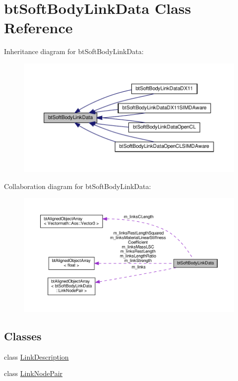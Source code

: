 \hypertarget{classbtSoftBodyLinkData}{}\section{bt\+Soft\+Body\+Link\+Data Class Reference}
\label{classbtSoftBodyLinkData}


Inheritance diagram for bt\+Soft\+Body\+Link\+Data\+:
\nopagebreak
\begin{figure}[H]
\begin{center}
\leavevmode
\includegraphics[width=350pt]{classbtSoftBodyLinkData__inherit__graph}
\end{center}
\end{figure}


Collaboration diagram for bt\+Soft\+Body\+Link\+Data\+:
\nopagebreak
\begin{figure}[H]
\begin{center}
\leavevmode
\includegraphics[width=350pt]{classbtSoftBodyLinkData__coll__graph}
\end{center}
\end{figure}
\subsection*{Classes}
\begin{DoxyCompactItemize}
\item 
class \hyperlink{classbtSoftBodyLinkData_1_1LinkDescription}{Link\+Description}
\item 
class \hyperlink{classbtSoftBodyLinkData_1_1LinkNodePair}{Link\+Node\+Pair}
\end{DoxyCompactItemize}
